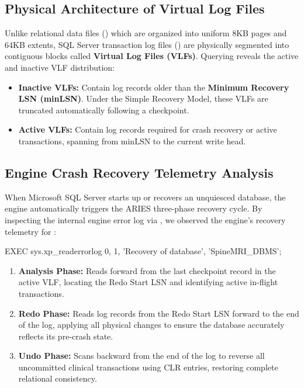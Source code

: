 \subsection{Physical Architecture of Virtual Log Files}
Unlike relational data files () which are organized into uniform 8KB pages and 64KB extents, SQL Server transaction log files () are physically segmented into contiguous blocks called \textbf{Virtual Log Files (VLFs)}. 
Querying  reveals the active and inactive VLF distribution:
\begin{itemize}
    \item \textbf{Inactive VLFs:} Contain log records older than the \textbf{Minimum Recovery LSN (minLSN)}. Under the Simple Recovery Model, these VLFs are truncated automatically following a checkpoint.
    \item \textbf{Active VLFs:} Contain log records required for crash recovery or active transactions, spanning from $\mathrm{minLSN}$ to the current write head.
\end{itemize}

\subsection{Engine Crash Recovery Telemetry Analysis}
When Microsoft SQL Server starts up or recovers an unquiesced database, the engine automatically triggers the ARIES three-phase recovery cycle. By inspecting the internal engine error log via , we observed the engine's recovery telemetry for :
\begin{SQLCode}
EXEC sys.xp_readerrorlog 0, 1, 'Recovery of database', 'SpineMRI_DBMS';
\end{SQLCode}

\begin{enumerate}
    \item \textbf{Analysis Phase:} Reads forward from the last checkpoint record in the active VLF, locating the Redo Start LSN and identifying active in-flight transactions.
    \item \textbf{Redo Phase:} Reads log records from the Redo Start LSN forward to the end of the log, applying all physical changes to ensure the database accurately reflects its pre-crash state.
    \item \textbf{Undo Phase:} Scans backward from the end of the log to reverse all uncommitted clinical transactions using CLR entries, restoring complete relational consistency.
\end{enumerate}

